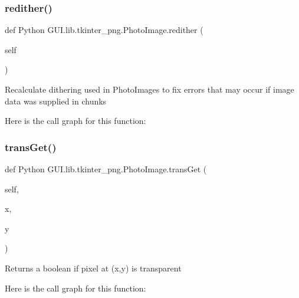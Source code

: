 \subsubsection{\texorpdfstring{redither()}{redither()}}
{\footnotesize\ttfamily def Python G\+U\+I.\+lib.\+tkinter\+\_\+png.\+Photo\+Image.\+redither (\begin{DoxyParamCaption}\item[{}]{self }\end{DoxyParamCaption})}

\begin{DoxyVerb}Recalculate dithering used in PhotoImages to fix errors that may occur if image data was supplied in chunks\end{DoxyVerb}
 Here is the call graph for this function\+:
\mbox{\label{class_python_01_g_u_i_1_1lib_1_1tkinter__png_1_1_photo_image_aae7b7df768ddbee6361a580e6a442743}} 
\subsubsection{\texorpdfstring{trans\+Get()}{transGet()}}
{\footnotesize\ttfamily def Python G\+U\+I.\+lib.\+tkinter\+\_\+png.\+Photo\+Image.\+trans\+Get (\begin{DoxyParamCaption}\item[{}]{self,  }\item[{}]{x,  }\item[{}]{y }\end{DoxyParamCaption})}

\begin{DoxyVerb}Returns a boolean if pixel at (x,y) is transparent\end{DoxyVerb}
 Here is the call graph for this function\+:
\mbox{\label{class_python_01_g_u_i_1_1lib_1_1tkinter__png_1_1_photo_image_a05986ba56b25e3c6a552cbf4d27f98f5}} 
